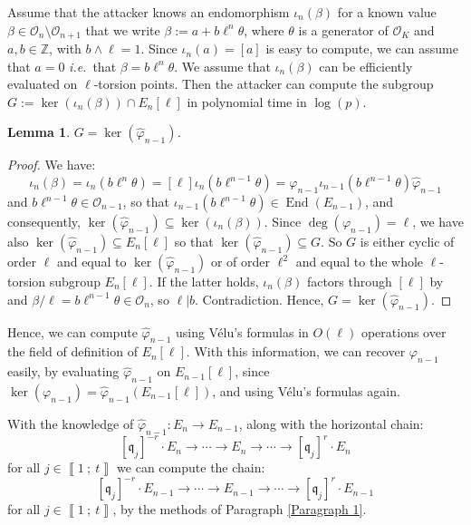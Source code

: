 \documentclass[a4paper,10pt,notitlepage]{report}
\theoremstyle{definition}
\theoremstyle{plain}
\newtheorem{Lemma}[Definition]{Lemma}
\theoremstyle{definition}
\newcommand{\ie}{\emph{i.e.}\ }
\newcommand{\Z}{\mathbb{Z}}
\newcommand{\mO}{\mathcal{O}}
\renewcommand{\i}[2]{\left\llbracket #1~;~#2\right\rrbracket}
\renewcommand{\(}{\left(}
\renewcommand{\)}{\right)}
\newcommand{\mf}[1]{\mathfrak{#1}}
\DeclareMathOperator{\End}{End}
\begin{document}
Assume that the attacker knows an endomorphism $\iota_n(\beta)$ for a known value $\beta\in\mO_n\setminus \mO_{n+1}$ that we write $\beta:=a+b\ell^n\theta$, where $\theta$ is a generator of $\mO_K$ and $a,b\in\Z$, with $b\wedge \ell=1$. Since $\iota_n(a)=[a]$ is easy to compute, we can assume that $a=0$ \ie that $\beta=b\ell^n\theta$. We assume that $\iota_n(\beta)$ can be efficiently evaluated on $\ell$-torsion points. Then the attacker can compute the subgroup $G:=\ker(\iota_n(\beta))\cap  E_n[\ell]$ in polynomial time in $\log(p)$. 

\begin{Lemma}
$G=\ker(\widehat{\varphi}_{n-1})$.
\end{Lemma}

\begin{proof}
We have:
\[\iota_n(\beta)=\iota_n(b\ell^n\theta)=[\ell]\iota_n(b\ell^{n-1}\theta)=\varphi_{n-1}\iota_{n-1}(b\ell^{n-1}\theta)\widehat{\varphi}_{n-1}\]
and $b\ell^{n-1}\theta\in\mO_{n-1}$, so that $\iota_{n-1}(b\ell^{n-1}\theta)\in\End(E_{n-1})$, and consequently, $\ker(\widehat{\varphi}_{n-1})\subseteq\ker(\iota_n(\beta))$. Since $\deg(\varphi_{n-1})=\ell$, we have also $\ker(\widehat{\varphi}_{n-1})\subseteq E_{n}[\ell]$ so that $\ker(\widehat{\varphi}_{n-1})\subseteq G$.  So $G$ is either cyclic of order $\ell$ and equal to $\ker(\widehat{\varphi}_{n-1})$ or of order $\ell^2$ and equal to the whole $\ell$-torsion subgroup $E_n[\ell]$. If the latter holds, $\iota_n(\beta)$ factors through $[\ell]$ by \cite[Corollary III.4.11]{Silverman1} and $\beta/\ell=b\ell^{n-1}\theta\in\mO_n$, so $\ell|b$. Contradiction. Hence, $G=\ker(\widehat{\varphi}_{n-1})$.
\end{proof}

Hence, we can compute $\widehat{\varphi}_{n-1}$ using V\'{e}lu's formulas in $O(\ell)$ operations over the field of definition of $E_n[\ell]$. With this information, we can recover $\varphi_{n-1}$ easily, by evaluating $\widehat{\varphi}_{n-1}$ on $E_{n-1}[\ell]$, since $\ker(\varphi_{n-1})=\widehat{\varphi}_{n-1}(E_{n-1}[\ell])$, and using V\'{e}lu's formulas again.

With the knowledge of $\widehat{\varphi}_{n-1}:E_n\longrightarrow E_{n-1}$, along with the horizontal chain:
\[[\mf{q}_j]^{-r}\cdot E_n\longrightarrow \cdots \longrightarrow E_n\longrightarrow \cdots\longrightarrow [\mf{q}_j]^{r}\cdot E_n\]
for all $j\in\i{1}{t}$ we can compute the chain:
\[[\mf{q}_j]^{-r}\cdot E_{n-1}\longrightarrow \cdots \longrightarrow E_{n-1}\longrightarrow \cdots\longrightarrow [\mf{q}_j]^{r}\cdot E_{n-1}\]
for all $j\in\i{1}{t}$, by the methods of Paragraph \ref{Paragraph 1}. 
\end{document}
